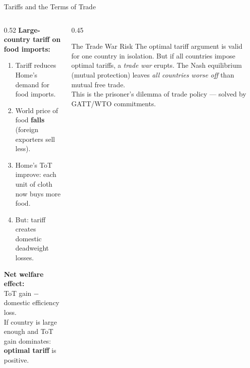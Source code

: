 \documentclass[aspectratio=169]{beamer}
\begin{document}
\begin{frame}{Tariffs and the Terms of Trade}
\begin{columns}
\begin{column}{0.52\textwidth}
\textbf{Large-country tariff on food imports:}
\begin{enumerate}
  \item Tariff reduces Home's demand for food imports.
  \item World price of food \textbf{falls} (foreign exporters sell less).
  \item Home's ToT improve: each unit of cloth now buys more food.
  \item But: tariff creates domestic deadweight losses.
\end{enumerate}
\vspace{0.3em}
\textbf{Net welfare effect:}\\
ToT gain $-$ domestic efficiency loss.\\
If country is large enough and ToT gain dominates: \textbf{optimal tariff} is positive.
\end{column}
\begin{column}{0.45\textwidth}
\begin{alertblock}{The Trade War Risk}
  The optimal tariff argument is valid for one country in isolation. But if all countries impose optimal tariffs, a \emph{trade war} erupts. The Nash equilibrium (mutual protection) leaves \emph{all countries worse off} than mutual free trade.\\[0.3em]
  This is the prisoner's dilemma of trade policy --- solved by GATT/WTO commitments.
\end{alertblock}
\end{column}
\end{columns}
\end{frame}
\end{document}
